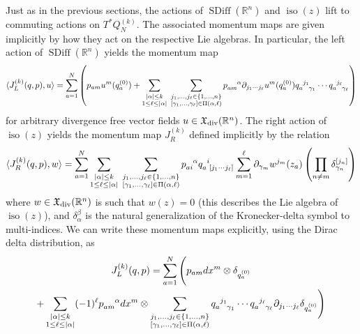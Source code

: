 \documentclass[12pt]{amsart}
\newcommand{\R}{\ensuremath{\mathbb{R}}}
\DeclareMathOperator{\SDiff}{SDiff}
\DeclareMathOperator{\iso}{iso}
\begin{document}
  Just as in the previous sections, the actions of $\SDiff(\R^n)$ and $\iso(z)$ lift to commuting actions on $T^*Q_N^{(k)}$.
  The associated momentum maps are given implicitly by how they act on the respective Lie algebras.
  In particular, the left action of $\SDiff(\R^n)$ yields the momentum map
  \begin{equation*}
  	\langle J_L^{(k)}(q,p) , u \rangle =
	\sum_{a=1}^N \left( p_{am} u^m(q^{(0)}_a) +
    \sum_{\substack{ |\alpha| \leq k \\ 1 \leq \ell \leq |\alpha| }} \;
		\sum_{
			\substack{
				j_1,\dots,j_\ell \in \{1,\dots,n\} \\
				[\gamma_1,\dots,\gamma_\ell] \in \Pi(\alpha,\ell)
				}
			}
			p\indices{_a_m^\alpha} \partial_{j_1 \cdots j_\ell}u^m (q^{(0)}_a)
      q\indices{_a^{j_1}_{\gamma_1}} \cdots
      q\indices{_a^{j_\ell}_{\gamma_\ell}}
			\right)
  \end{equation*}
  for arbitrary divergence free vector fields $u \in \mathfrak{X}_{\rm div}(\R^n)$.
  The right action of $\iso(z)$ yields the momentum map $J_R^{(k)}$ defined implicitly by the relation
  \begin{equation*}
    \langle J_R^{(k)}(q,p) , w \rangle = \sum_{a=1}^N
    \sum_{\substack{ |\alpha| \leq k \\ 1 \leq \ell \leq |\alpha| }} \;
		\sum_{
			\substack{
				j_1,\dots,j_\ell \in \{1,\dots,n\} \\
				[\gamma_1,\dots,\gamma_\ell] \in \Pi(\alpha,\ell)
				}
			}
			p\indices{_a_i^\alpha} q\indices{_a^{i}_{[j_1 \cdots j_\ell]}}
      \sum_{m=1}^\ell  \partial_{\gamma_m} w^{j_m}(z_a) \left( \prod_{n \neq m}  \delta_{\gamma_n}^{[j_n]} \right)
  \end{equation*}
  where $w \in \mathfrak{X}_{\rm div}(\R^n)$ is such that $w(z) = 0$ (this describes the Lie algebra of $\iso(z)$),
  and $\delta_\alpha^\beta$ is the natural generalization of the Kronecker-delta symbol to multi-indices.
  We can write these momentum maps explicitly, using the Dirac delta distribution, as
  \begin{multline*}
    J_L^{(k)}(q,p) =
    \sum_{a=1}^N \Bigg(
    p_{am} dx^m \otimes \delta_{q^{(0)}_a} \\
  + \sum_{\substack{ |\alpha| \leq k \\ 1 \leq \ell \leq |\alpha| }}
    (-1)^\ell p\indices{_{am}^\alpha} dx^m \otimes
      \sum_{\substack{
          j_1,\dots,j_\ell \in \{1,\dots,n\} \\
          [\gamma_1,\dots,\gamma_\ell] \in \Pi( \alpha,\ell)
          }
        }
      q\indices{_a^{j_1}_{\gamma_1}} \cdots q\indices{_a^{j_\ell}_{\gamma_\ell}}
      \partial_{j_1 \cdots j_\ell} \delta_{q^{(0)}_a}
      \Bigg)
  \end{multline*}
\end{document}
